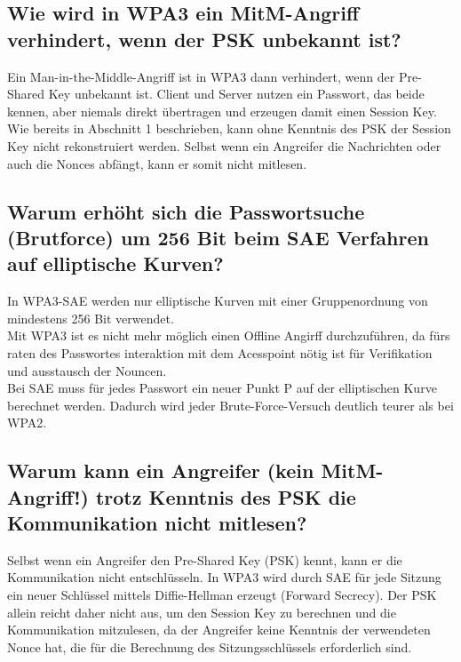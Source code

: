 \subsection{Wie wird in WPA3 ein MitM-Angriff verhindert, wenn der PSK unbekannt ist?}
Ein Man-in-the-Middle-Angriff ist in WPA3 dann verhindert, wenn der Pre-Shared Key unbekannt ist. Client und Server nutzen ein Passwort, das beide kennen, aber niemals direkt übertragen und erzeugen damit einen Session Key. Wie bereits in Abschnitt 1 beschrieben, kann ohne Kenntnis des PSK der Session Key nicht rekonstruiert werden. Selbst wenn ein Angreifer die Nachrichten oder auch die Nonces abfängt, kann er somit nicht mitlesen.

\subsection{Warum erhöht sich die Passwortsuche (Brutforce) um 256 Bit beim SAE Verfahren auf elliptische Kurven?}
In WPA3-SAE werden nur elliptische Kurven mit einer Gruppenordnung von mindestens 256 Bit verwendet. \\
Mit WPA3 ist es nicht mehr möglich einen Offline Angirff durchzuführen, da fürs raten des Passwortes interaktion mit dem Acesspoint nötig ist für Verifikation und ausstausch der Nouncen.\\
Bei SAE muss für jedes Passwort ein neuer Punkt P auf der elliptischen Kurve berechnet werden. Dadurch wird jeder Brute-Force-Versuch deutlich teurer als bei WPA2.

\subsection{Warum kann ein Angreifer (kein MitM-Angriff!) trotz Kenntnis des PSK die Kommunikation nicht mitlesen?}
Selbst wenn ein Angreifer den Pre-Shared Key (PSK) kennt, kann er die Kommunikation nicht entschlüsseln. In WPA3 wird durch SAE für jede Sitzung ein neuer Schlüssel mittels Diffie-Hellman erzeugt (Forward Secrecy). Der PSK allein reicht daher nicht aus, um den Session Key zu berechnen und die Kommunikation mitzulesen, da der Angreifer keine Kenntnis der verwendeten Nonce hat, die für die Berechnung des Sitzungsschlüssels erforderlich sind.